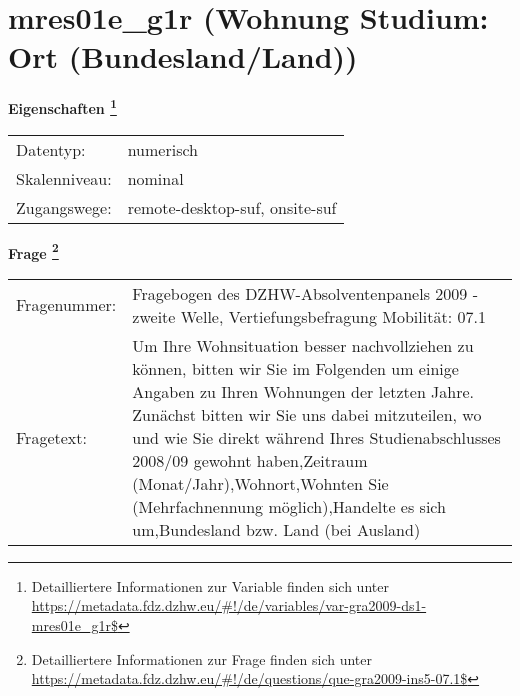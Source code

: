 
    \setcounter{footnote}{0}

    \vspace*{-1.8cm}
	\section{mres01e\_g1r (Wohnung Studium: Ort (Bundesland/Land))}
	\label{section:mres01e_g1r}



    \vspace*{0.5cm}
    \noindent\textbf{Eigenschaften
	\footnote{Detailliertere Informationen zur Variable finden sich unter
		\url{https://metadata.fdz.dzhw.eu/\#!/de/variables/var-gra2009-ds1-mres01e_g1r$}}}\\
	\begin{tabularx}{\hsize}{@{}lX}
	Datentyp: & numerisch \\
	Skalenniveau: & nominal \\
	Zugangswege: &
	  remote-desktop-suf, 
	  onsite-suf
 \\
    \end{tabularx}



				\vspace*{0.5cm}
                \noindent\textbf{Frage
	                \footnote{Detailliertere Informationen zur Frage finden sich unter
		              \url{https://metadata.fdz.dzhw.eu/\#!/de/questions/que-gra2009-ins5-07.1$}}}\\
				\begin{tabularx}{\hsize}{@{}lX}
					Fragenummer: &
					  Fragebogen des DZHW-Absolventenpanels 2009 - zweite Welle, Vertiefungsbefragung Mobilität:
					  07.1
 \\
					Fragetext: & Um Ihre Wohnsituation besser nachvollziehen zu können, bitten wir Sie im Folgenden um einige Angaben zu Ihren Wohnungen der letzten Jahre. Zunächst bitten wir Sie uns dabei mitzuteilen, wo und wie Sie direkt während Ihres Studienabschlusses 2008/09 gewohnt haben,Zeitraum (Monat/Jahr),Wohnort,Wohnten Sie (Mehrfachnennung möglich),Handelte es sich um,Bundesland bzw. Land (bei Ausland) \\
				\end{tabularx}






